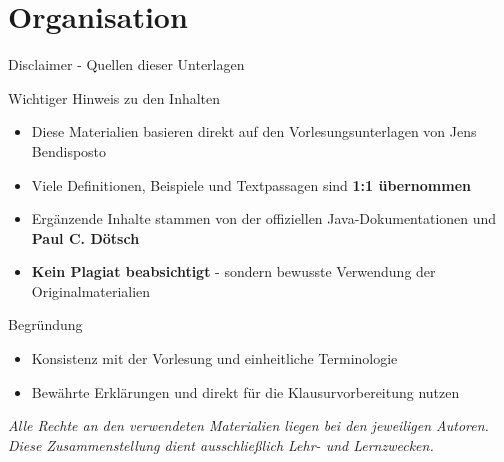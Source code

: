 \section{Organisation}

\begin{frame}{Disclaimer - Quellen dieser Unterlagen}
  \begin{alertblock}{Wichtiger Hinweis zu den Inhalten}
    \begin{itemize}
      \item Diese Materialien basieren direkt auf den Vorlesungsunterlagen von Jens Bendisposto
      \item Viele Definitionen, Beispiele und Textpassagen sind \textbf{1:1 übernommen}
      \item Ergänzende Inhalte stammen von der offiziellen Java-Dokumentationen und \textbf{Paul C. Dötsch}
      \item \textbf{Kein Plagiat beabsichtigt} - sondern bewusste Verwendung der Originalmaterialien
    \end{itemize}
  \end{alertblock}

  \begin{exampleblock}{Begründung}
    \begin{itemize}
      \item Konsistenz mit der Vorlesung und einheitliche Terminologie
      \item Bewährte Erklärungen und direkt für die Klausurvorbereitung nutzen
    \end{itemize}
  \end{exampleblock}

  \begin{center}
    {\footnotesize \textit{Alle Rechte an den verwendeten Materialien liegen bei den jeweiligen Autoren. \\
    Diese Zusammenstellung dient ausschließlich Lehr- und Lernzwecken.}}
  \end{center}
\end{frame}

